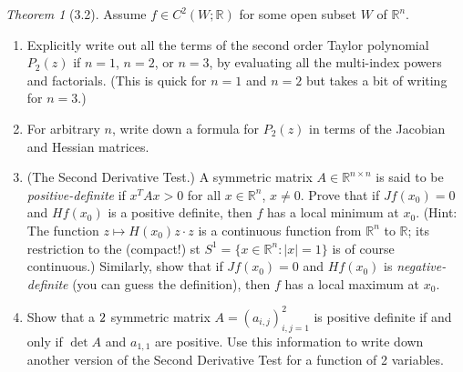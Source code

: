 \documentclass[12pt]{article}
\theoremstyle{remark}
\theoremstyle{named}
\newtheorem*{theorem}{Theorem}
\newcommand{\R}{\mathbb R}
\begin{document}
\begin{theorem}[3.2]
    Assume \(f \in C^2(W;\R)\) for some open subset \(W\) of \(\R^n\).
    \begin{enumerate}
        \item Explicitly write out all the terms of the second order Taylor polynomial \(P_2(z)\) if \(n = 1\), \(n = 2\), or \(n = 3\), by evaluating all the multi-index powers and factorials. (This is quick for \(n = 1\) and \(n = 2\) but takes a bit of writing for \(n = 3\).)
        \item For arbitrary \(n\), write down a formula for \(P_2(z)\) in terms of the Jacobian and Hessian matrices.
        \item (The Second Derivative Test.) A symmetric matrix \(A \in \R^{n \times n}\) is said to be \textit{positive-definite} if \(x^T A x > 0\) for all \(x \in \R^n\), \(x \neq 0\). Prove that if \(J f(x_0) = 0\) and \(H f(x_0)\) is a positive definite, then \(f\) has a local minimum at \(x_0\). (Hint: The function \(z \mapsto H(x_0)z \cdot z\) is a continuous function from \(\R^n\) to \(\R\); its restriction to the (compact!) st \(S^1 = \{x \in \R^n : |x| = 1\}\) is of course continuous.) Similarly, show that if \(J f(x_0) = 0\) and \(H f(x_0)\) is \textit{negative-definite} (you can guess the definition), then \(f\) has a local maximum at \(x_0\).
        \item Show that a \(2 \time 2\) symmetric matrix \(A = (a_{i,j})_{i, j = 1}^2\) is positive definite if and only if \(\det A\) and \(a_{1,1}\) are positive. Use this information to write down another version of the Second Derivative Test for a function of 2 variables.
    \end{enumerate}
\end{theorem}
\end{document}
